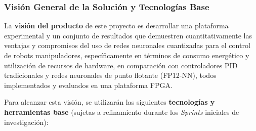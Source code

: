 \documentclass[12pt]{article}
\begin{document}
\subsubsection{Visión General de la Solución y Tecnologías Base}
\label{sssec:vision_solucion_scrum}

La \textbf{visión del producto} de este proyecto es desarrollar una plataforma experimental y un conjunto de resultados que demuestren cuantitativamente las ventajas y compromisos del uso de redes neuronales cuantizadas para el control de robots manipuladores, específicamente en términos de consumo energético y utilización de recursos de hardware, en comparación con controladores PID tradicionales y redes neuronales de punto flotante (FP12-NN), todos implementados y evaluados en una plataforma FPGA.

Para alcanzar esta visión, se utilizarán las siguientes \textbf{tecnologías y herramientas base} (sujetas a refinamiento durante los \textit{Sprints} iniciales de investigación):
\end{document}
